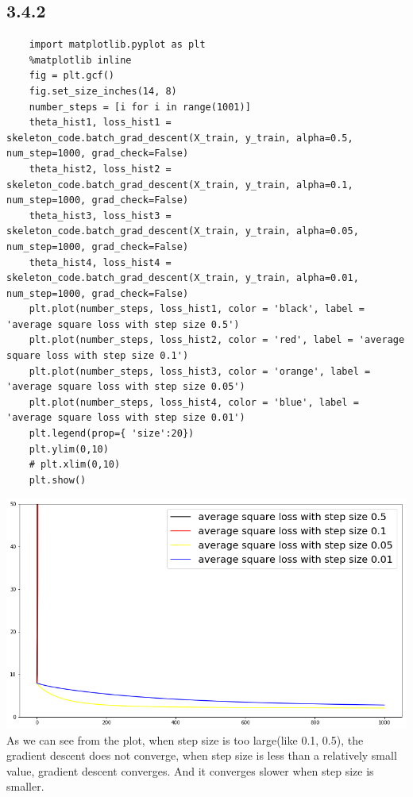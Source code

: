 \documentclass{article}
\begin{document}
\subsection{3.4.2}
\begin{verbatim}
    import matplotlib.pyplot as plt
    %matplotlib inline
    fig = plt.gcf()
    fig.set_size_inches(14, 8)
    number_steps = [i for i in range(1001)]
    theta_hist1, loss_hist1 = skeleton_code.batch_grad_descent(X_train, y_train, alpha=0.5, num_step=1000, grad_check=False)
    theta_hist2, loss_hist2 = skeleton_code.batch_grad_descent(X_train, y_train, alpha=0.1, num_step=1000, grad_check=False)
    theta_hist3, loss_hist3 = skeleton_code.batch_grad_descent(X_train, y_train, alpha=0.05, num_step=1000, grad_check=False)
    theta_hist4, loss_hist4 = skeleton_code.batch_grad_descent(X_train, y_train, alpha=0.01, num_step=1000, grad_check=False)
    plt.plot(number_steps, loss_hist1, color = 'black', label = 'average square loss with step size 0.5')
    plt.plot(number_steps, loss_hist2, color = 'red', label = 'average square loss with step size 0.1')
    plt.plot(number_steps, loss_hist3, color = 'orange', label = 'average square loss with step size 0.05')
    plt.plot(number_steps, loss_hist4, color = 'blue', label = 'average square loss with step size 0.01')
    plt.legend(prop={ 'size':20})
    plt.ylim(0,10)
    # plt.xlim(0,10)
    plt.show()
\end{verbatim}
\includegraphics[scale=0.6]{342.png}
As we can see from the plot, when step size is too large(like 0.1, 0.5), the gradient descent does not converge, when step size is less than a relatively small value, gradient descent converges. And it converges slower when step size is smaller.
\endsubsection
\end{document}
